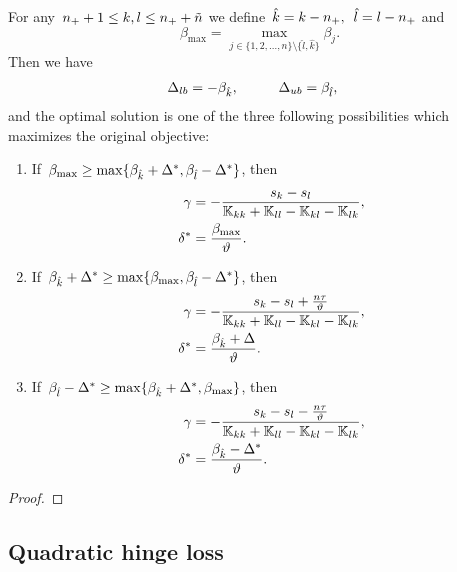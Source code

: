 \begin{lemma}
  For any~$n_{+} + 1\le k,l \le n_{+} + \tilde{n}$ we define~$\hat{k} = k - n_{+},$~$\hat{l} = l - n_{+}$ and
  \begin{equation*}
    \beta_{\max}
      = \max_{j \in \{1, 2, \ldots, n\} \setminus \{\hat{l}, \hat{k}\}} \beta_j.
  \end{equation*}
  Then we have
  \begin{alignat*}{2}
    \Delta_{lb} & = - \beta_{\hat{k}}, & \qquad
    \Delta_{ub} & = \beta_{\hat{l}},
  \end{alignat*}
  and the optimal solution is one of the three following possibilities which maximizes the original objective:
  \begin{enumerate}
    \item If~$\beta_{\max} \geq \max\{\beta_{\hat{k}} + \Delta^{*}, \beta_{\hat{l}} - \Delta^{*}\}$, then
    \begin{align*}
      \gamma     & = -\frac{s_k - s_l}{\mathbb{K}_{kk} + \mathbb{K}_{ll} - \mathbb{K}_{kl} - \mathbb{K}_{lk}}, \\
      \delta^{*} & = \frac{\beta_{\max}}{\vartheta}.
    \end{align*}
    \item If~$\beta_{\hat{k}} + \Delta^{*} \geq \max\{\beta_{\max} , \beta_{\hat{l}} - \Delta^{*}\}$, then
    \begin{align*}
      \gamma     & = -\frac{s_k - s_l + \frac{n\tau}{\vartheta}}{\mathbb{K}_{kk} + \mathbb{K}_{ll} - \mathbb{K}_{kl} - \mathbb{K}_{lk}}, \\
      \delta^{*} & = \frac{\beta_{\hat{k}} + \Delta}{\vartheta}.
    \end{align*}
    \item If~$\beta_{\hat{l}} - \Delta^{*} \geq \max\{\beta_{\hat{k}} + \Delta^{*}, \beta_{\max}\}$, then
    \begin{align*}
      \gamma     & = -\frac{s_k - s_l - \frac{n\tau}{\vartheta}}{\mathbb{K}_{kk} + \mathbb{K}_{ll} - \mathbb{K}_{kl} - \mathbb{K}_{lk}}, \\
      \delta^{*} & = \frac{\beta_{\hat{k}} - \Delta^{*}}{\vartheta}.
    \end{align*}
  \end{enumerate}
\end{lemma}

\begin{proof}
\end{proof}

\subsection*{Quadratic hinge loss}

